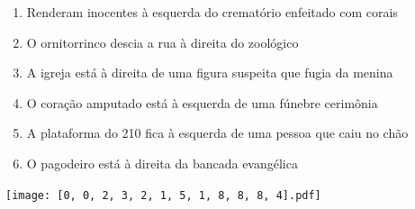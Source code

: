 \documentclass[12pt]{article}
\begin{document}
		 

\pagebreak


	\begin{enumerate}
		  \sffamily %
		  \large %


\vfill \item
Renderam inocentes	%
à esquerda
do crematório enfeitado com corais	%

\vfill \item
O ornitorrinco descia a rua	%
à direita
do zoológico	%

\vfill \item
A igreja está	%
à direita
de uma figura suspeita que fugia da menina	%

\vfill \item
O coração amputado está	%
à esquerda
de uma fúnebre cerimônia	%

\vfill \item
A plataforma do 210 fica	%
à esquerda
de uma pessoa que caiu no chão	%

\vfill \item
O pagodeiro está	%
à direita
da bancada evangélica	%
	\end{enumerate}
		  
		  \hfill

		  \vfill

\texttt{[image: [0, 0, 2, 3, 2, 1, 5, 1, 8, 8, 8, 4].pdf]}


	\hfill	  	  


\pagebreak			
\end{document}
